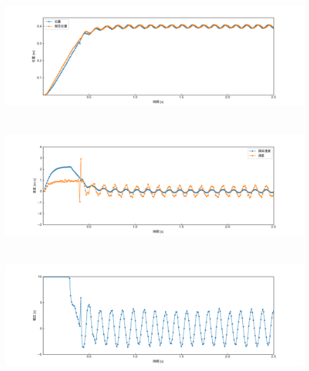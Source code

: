 \documentclass[12pt]{jsarticle}
\begin{document}
\begin{figure}[H]
  \begin{center}
    \includegraphics[clip,width=13.0cm, height=4.4cm]{../img/Exp4-1.png}
    \caption{}
    \label{Exp4-1}
  \end{center}
\end{figure}
\begin{figure}[H]
  \begin{center}
    \includegraphics[clip,width=13.0cm, height=4.4cm]{../img/Exp4-2.png}
    \caption{}
    \label{Exp4-2}
  \end{center}
\end{figure}
\begin{figure}[H]
  \begin{center}
    \includegraphics[clip,width=13.0cm, height=4.4cm]{../img/Exp4-3.png}
    \caption{}
    \label{Exp4-3}
  \end{center}
\end{figure}
\end{document}

